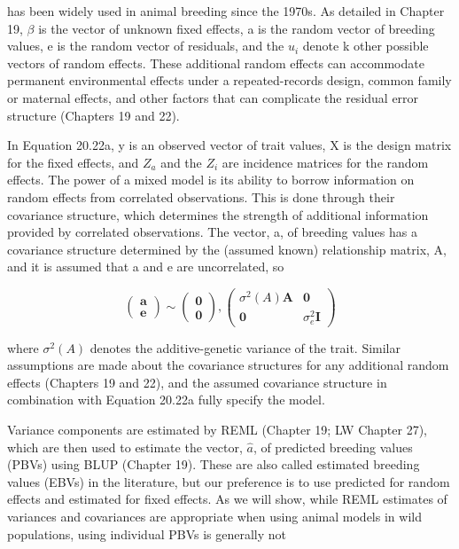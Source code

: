 \documentclass{article}
\begin{document}
has been widely used in animal breeding since the 1970s. As detailed in Chapter 19,  $ \beta $ is the vector of unknown fixed effects, a is the random vector of breeding values, e is the random vector of residuals, and the  $ u_i $ denote k other possible vectors of random effects. These additional random effects can accommodate permanent environmental effects under a repeated-records design, common family or maternal effects, and other factors that can complicate the residual error structure (Chapters 19 and 22).

In Equation 20.22a, y is an observed vector of trait values, X is the design matrix for the fixed effects, and  $ Z_{a} $ and the  $ Z_{i} $ are incidence matrices for the random effects. The power of a mixed model is its ability to borrow information on random effects from correlated observations. This is done through their covariance structure, which determines the strength of additional information provided by correlated observations. The vector, a, of breeding values has a covariance structure determined by the (assumed known) relationship matrix, A, and it is assumed that a and e are uncorrelated, so

\begin{equation}
\begin{pmatrix}{{{\mathbf{a}}}} \\{{{\mathbf{e}}}}\end{pmatrix}\sim\begin{pmatrix}{{{\mathbf{0}}}} \\{{{\mathbf{0}}}}\end{pmatrix},\begin{pmatrix}{{{\sigma^{2}(A)\mathbf{A}}}}&{{{\mathbf{0}}}} \\{{{\mathbf{0}}}}&{{{\sigma_{e}^{2}\mathbf{I}}}}\end{pmatrix}
\tag{20.22b}
\label{eq:20_22b}
\end{equation}

where  $ \sigma^{2}(A) $ denotes the additive-genetic variance of the trait. Similar assumptions are made about the covariance structures for any additional random effects (Chapters 19 and 22), and the assumed covariance structure in combination with Equation 20.22a fully specify the model.

Variance components are estimated by REML (Chapter 19; LW Chapter 27), which are then used to estimate the vector,  $ \hat{a} $, of predicted breeding values (PBVs) using BLUP (Chapter 19). These are also called estimated breeding values (EBVs) in the literature, but our preference is to use predicted for random effects and estimated for fixed effects. As we will show, while REML estimates of variances and covariances are appropriate when using animal models in wild populations, using individual PBVs is generally not
\end{document}
